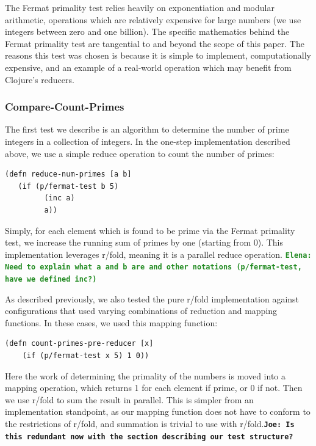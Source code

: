 \documentclass[12pt]{article}
\newcommand{\comment}[1]{{\bf \tt  {#1}}}
\newcommand{\emcomment}[1]{\textcolor{ForestGreen}{\comment{Elena: {#1}}}}
\newcommand{\joecomment}[1]{\textcolor{JoesGold}{\comment{Joe: {#1}}}}
\begin{document}
The Fermat primality test relies heavily on exponentiation and modular arithmetic, operations which are relatively expensive for large numbers (we use integers between zero and one billion). The specific mathematics behind the Fermat primality test are tangential to and beyond the scope of this paper. The reasons this test was chosen is 
because it is simple to implement, computationally expensive, and an example of a real-world operation which may benefit from Clojure's reducers. 

\subsubsection{Compare-Count-Primes}\label{sec:count-primes}
The first test we describe is an algorithm to determine the number of prime integers in a  collection of integers. In the one-step implementation described above, we use a simple reduce operation to count the number of primes:

\begin{verbatim}
(defn reduce-num-primes [a b] 
   (if (p/fermat-test b 5)
         (inc a)
         a))
\end{verbatim}

Simply, for each element which is found to be prime via the Fermat primality test, we increase the running sum of primes by one (starting from 0). This implementation leverages r/fold, meaning it is a parallel reduce operation. 
\emcomment{Need to explain what a and b are and other notations (p/fermat-test, have we defined inc?) }

As described previously, we also tested the pure r/fold implementation against configurations that used varying combinations of reduction and mapping functions. In these cases, we used this mapping function:

\begin{verbatim}
(defn count-primes-pre-reducer [x] 
    (if (p/fermat-test x 5) 1 0))
\end{verbatim}

Here the work of determining the primality of the numbers is moved into a mapping operation, which returns 1 for each element if prime, or 0 if not. Then we use r/fold to sum the result in parallel. This is simpler from an implementation standpoint, as our mapping function does not have to conform to the restrictions of r/fold, and summation is trivial to use with r/fold.\joecomment{Is this redundant now with the section describing our test structure?}
\end{document}
